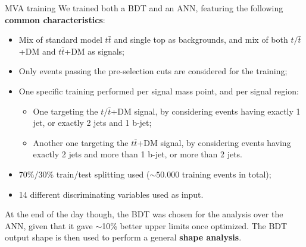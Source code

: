 \documentclass[8pt]{beamer}
\begin{document}
\begin{frame}{MVA training}
\justifying
We \alert{trained both a BDT and an ANN}, featuring the following \textbf{common characteristics}:
\vspace{-5pt}
\begin{itemize}
\justifying
\item Mix of standard model $t \bar t$ and single top as backgrounds, and mix of both $t/\bar t$+DM and $t \bar t$+DM as signals;
\item Only events passing the pre-selection cuts are considered for the training;
\item One specific training performed per signal mass point, and per signal region:
\begin{itemize}
\item One targeting the $t/\bar t$+DM signal, by considering events having exactly 1 jet, or exactly 2 jets and 1 b-jet;
\item Another one targeting the $t \bar t$+DM signal, by considering events having exactly 2 jets and more than 1 b-jet, or more than 2 jets.
\end{itemize}

\item 70\%/30\% train/test splitting used ($\sim 50.000$ training events in total);
\item 14 different discriminating variables used as input.
\end{itemize} \vfill

At the end of the day though, the \alert{BDT was chosen for the analysis} over the ANN, given that it gave $\sim$10\% better upper limits once optimized. \vfill
The BDT output shape is then used to perform a general \textbf{shape analysis}. \vfill
\end{frame}
\end{document}
